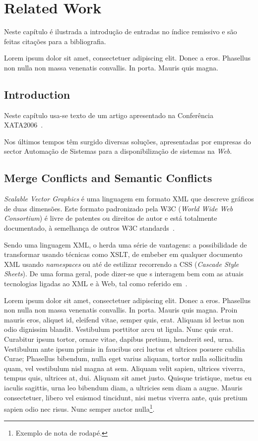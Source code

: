 \chapter{Related Work} \label{chap:sota}

Neste capítulo é ilustrada a introdução de entradas no índice
remissivo e são feitas citações para a bibliografia.

Lorem ipsum dolor sit amet, consectetuer adipiscing elit. Donec a
eros. Phasellus non nulla non massa venenatis convallis. In
porta. Mauris quis magna. 

\section{Introduction}

Neste capítulo usa-se texto de um artigo apresentado na Conferência
XATA2006~\citep{kn:MVL06-xata}.

Nos últimos tempos têm surgido diversas soluções, apresentadas por
empresas do sector Auto\-ma\-ção de Sistemas para a disponibilização de
sistemas \scadadms{} na \textit{Web}.

 

\section{Merge Conflicts and Semantic Conflicts}\label{sec:dialecto}

\emph{Scalable Vector Graphics} é uma
linguagem em formato XML que descreve gráficos de duas dimensões. 
Este formato padronizado pela W3C (\emph{World Wide Web Consortium})
é livre de patentes ou direitos de autor e está totalmente
documentado, à semelhança de outros W3C
standards~\citep{kn:svgdoc}.

Sendo uma linguagem XML, o \svg{} herda uma série de vantagens: a
possibilidade de transformar \svg{} usando técnicas como
XSLT, de embeber \svg{} em qualquer documento
XML usando \textit{namespaces} ou até de  
estilizar \svg{} recorrendo a CSS (\emph{Cascade Style Sheets}). 
De uma forma geral, pode dizer-se que \svg{}s interagem bem com as
atuais tecnologias ligadas ao XML e à Web, tal como referido
em~\citep{kn:svgibm,kn:svgw3c}.

Lorem ipsum dolor sit amet, consectetuer adipiscing elit. Donec a
eros. Phasellus non nulla non massa venenatis convallis. In
porta. Mauris quis magna. Proin mauris eros, aliquet id, eleifend
vitae, semper quis, erat. Aliquam id lectus non odio dignissim
blandit. Vestibulum porttitor arcu ut ligula. Nunc quis
erat. Curabitur ipsum tortor, ornare vitae, dapibus pretium, hendrerit
sed, urna. Vestibulum ante ipsum primis in faucibus orci luctus et
ultrices posuere cubilia Curae; Phasellus bibendum, nulla eget varius
aliquam, tortor nulla sollicitudin quam, vel vestibulum nisl magna at
sem. Aliquam velit sapien, ultrices viverra, tempus quis, ultrices at,
dui. Aliquam sit amet justo. Quisque tristique, metus eu iaculis
sagittis, urna leo bibendum diam, a ultricies sem diam a augue. Mauris
consectetuer, libero vel euismod tincidunt, nisi metus viverra ante,
quis pretium sapien odio nec risus. Nunc semper auctor
nulla\footnote{Exemplo de nota de rodapé.}. 

